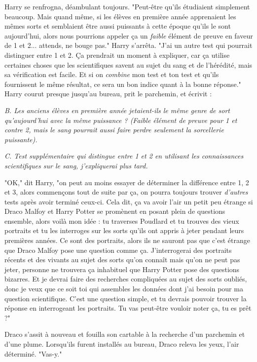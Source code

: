 Harry se renfrogna, déambulant toujours. "Peut-être qu'ils étudiaient simplement beaucoup. Mais quand même, si les élèves en première année apprenaient les mêmes sorts et semblaient être aussi puissants à cette époque qu'ils le sont aujourd'hui, alors nous pourrions appeler ça un \emph{faible}  élément de preuve en faveur de 1 et 2... attends, ne bouge pas." Harry s'arrêta. "J'ai un autre test qui pourrait distinguer entre 1 et 2. Ça prendrait un moment à expliquer, car ça utilise certaines choses que les scientifiques savent au sujet du sang et de l'hérédité, mais sa vérification est facile. Et si on \emph{combine}  mon test et ton test et qu'ils fournissent le même résultat, ce sera un bon indice quant à la bonne réponse." Harry courut presque jusqu'au bureau, prit le parchemin, et écrivit :

\emph{B. Les anciens élèves en première année jetaient-ils le même genre de sort qu'aujourd'hui avec la même puissance ? (Faible élément de preuve pour 1 et contre 2, mais le sang pourrait aussi faire perdre seulement la sorcellerie puissante).} 

\emph{C. Test supplémentaire qui distingue entre 1 et 2 en utilisant les connaissances scientifiques sur le sang, j'expliquerai plus tard.} 

"OK," dit Harry, "on peut au moins essayer de déterminer la différence entre 1, 2 et 3, alors commençons tout de suite par ça, on pourra toujours trouver \emph{d'autres}  tests après avoir terminé ceux-ci. Cela dit, ça va avoir l'air un petit peu étrange si Draco Malfoy et Harry Potter se promènent en posant plein de questions ensemble, alors voilà mon idée : tu traverses Poudlard et tu trouves des vieux portraits et tu les interroges sur les sorts qu'ils ont appris à jeter pendant leurs premières années. Ce sont des portraits, alors ils ne sauront pas que c'est étrange que Draco Malfoy pose une question comme ça. J'interrogerai des portraits récents et des vivants au sujet des sorts qu'on connaît mais qu'on ne peut pas jeter, personne ne trouvera ça inhabituel que Harry Potter pose des questions bizarres. Et je devrai faire des recherches compliquées au sujet des sorts oubliés, donc je veux que ce soit toi qui assembles les données dont j'ai besoin pour ma question scientifique. C'est une question simple, et tu devrais pouvoir trouver la réponse en interrogeant les portraits. Tu vas peut-être vouloir noter ça, tu es prêt ?"

Draco s'assit à nouveau et fouilla son cartable à la recherche d'un parchemin et d'une plume. Lorsqu'ils furent installés au bureau, Draco releva les yeux, l'air déterminé. "Vas-y."

